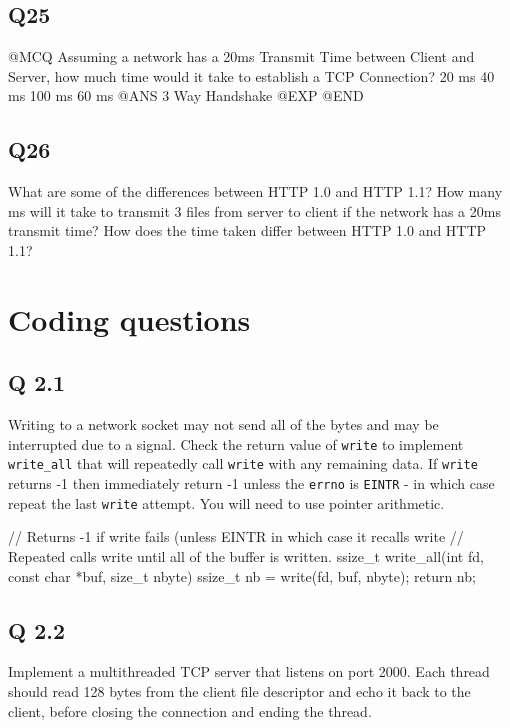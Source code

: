 \subsection{Q25}\label{q25}

@MCQ Assuming a network has a 20ms Transmit Time between Client and Server, how much time would it take to establish a TCP Connection? 20 ms 40 ms 100 ms 60 ms @ANS 3 Way Handshake @EXP @END

\subsection{Q26}\label{q26}

What are some of the differences between HTTP 1.0 and HTTP 1.1? How many ms will it take to transmit 3 files from server to client if the network has a 20ms transmit time? How does the time taken differ between HTTP 1.0 and HTTP 1.1?

\hypertarget{coding-questions}{\section{Coding questions}\label{coding-questions}}

\subsection{Q 2.1}\label{q-2.1-1}

Writing to a network socket may not send all of the bytes and may be interrupted due to a signal. Check the return value of \texttt{write} to implement \texttt{write\_all} that will repeatedly call \texttt{write} with any remaining data. If \texttt{write} returns -1 then immediately return -1 unless the \texttt{errno} is \texttt{EINTR} - in which case repeat the last \texttt{write} attempt. You will need to use pointer arithmetic.

\begin{code}[language=C]
// Returns -1 if write fails (unless EINTR in which case it recalls write
// Repeated calls write until all of the buffer is written.
ssize_t write_all(int fd, const char *buf, size_t nbyte) {
  ssize_t nb = write(fd, buf, nbyte);
  return nb;
}
\end{code}

\subsection{Q 2.2}\label{q-2.2}

Implement a multithreaded TCP server that listens on port 2000. Each thread should read 128 bytes from the client file descriptor and echo it back to the client, before closing the connection and ending the thread.

